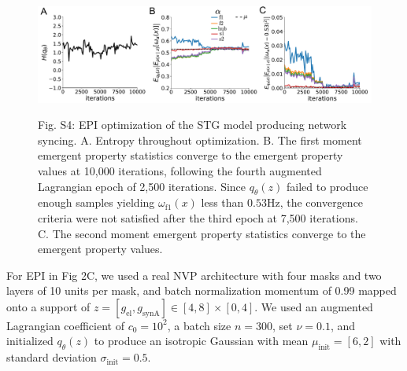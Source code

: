 \documentclass[11pt]{article}
\begin{document}
\begin{figure}
\begin{center}
\includegraphics[scale=0.45]{figures/figS4/figS4.pdf}
\end{center}
\begin{flushleft}
{\small Fig. S4: EPI optimization of the STG model producing network syncing. A. Entropy throughout optimization. B. The first moment emergent property statistics converge to the emergent property values at 10,000 iterations, following the fourth augmented Lagrangian epoch of 2,500 iterations.  Since $q_\theta(z)$ failed to produce enough samples yielding $\omega_{\text{f1}}(x)$ less than $0.53$Hz, the convergence criteria were not satisfied after the third epoch at 7,500 iterations.    C. The second moment emergent property statistics converge to the emergent property values.}
\end{flushleft}
\end{figure}

For EPI in Fig 2C, we used a real NVP architecture with four masks and two layers of 10 units per mask, and batch normalization momentum of 0.99 mapped onto a support of $z = [g_{\text{el}}, g_{\text{synA}}] \in [4,8] \times [0,4]$. We used an augmented Lagrangian coefficient of $c_0 = 10^{2}$, a batch size $n=300$, set $\nu = 0.1$, and initialized $q_\theta(z)$ to produce an isotropic Gaussian with mean $\mu_{\text{init}} = [6, 2]$ with standard deviation $\sigma_{\text{init}} = 0.5$.
\end{document}
